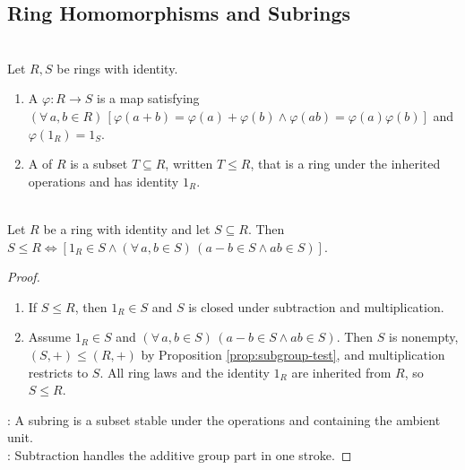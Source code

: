\subsection{Ring Homomorphisms and Subrings}

\begin{definition} \label{def:ring-homomorphism-and-subring} \\
Let $R,S$ be rings with identity.
\begin{enumerate}[label=(\roman*)]
\setlength{\itemsep}{0pt}
\item A  $\varphi:R\to S$ is a map satisfying $(\forall\,a,b\in R)\,[\varphi(a+b)=\varphi(a)+\varphi(b)\land\varphi(ab)=\varphi(a)\varphi(b)]$ and $\varphi(1_R)=1_S$.
\item A  of $R$ is a subset $T\subseteq R$, written $T\leq R$, that is a ring under the inherited operations and has identity $1_R$.
\end{enumerate}
\end{definition}

\begin{proposition} \label{prop:subring-test} \\
Let $R$ be a ring with identity and let $S\subseteq R$. Then $S\leq R \iff [1_R\in S\land(\forall\,a,b\in S)\,(a-b\in S\land ab\in S)]$.
\begin{proof}
\begin{enumerate}[label=\roman*.]
\setlength{\itemsep}{0pt}
\item[$(\Rightarrow)$] If $S\leq R$, then $1_R\in S$ and $S$ is closed under subtraction and multiplication.
\item[$(\Leftarrow)$] Assume $1_R\in S$ and $(\forall\,a,b\in S)\,(a-b\in S\land ab\in S)$. Then $S$ is nonempty, $(S,+)\leq(R,+)$ by Proposition \ref{prop:subgroup-test}, and multiplication restricts to $S$. All ring laws and the identity $1_R$ are inherited from $R$, so $S\leq R$.
\end{enumerate}
: A subring is a subset stable under the operations and containing the ambient unit.\\
: Subtraction handles the additive group part in one stroke.
\end{proof}
\end{proposition}
